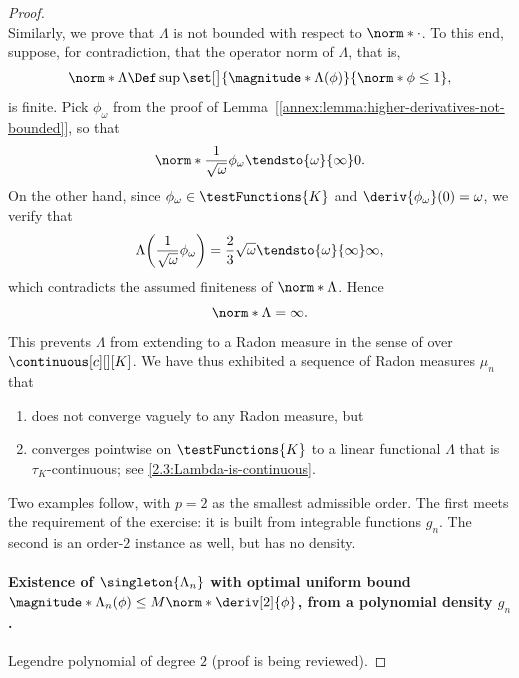 \begin{proof}
\begin{equation}
\end{equation}
% 
Similarly, we prove that $\Lambda$ is not bounded with respect to $\norm*{\cdot}$. To this end, suppose, for contradiction, %
that the operator norm of $\Lambda$, that is,
% 
\begin{equation}
  \norm*{\Lambda} \Def \sup\set[\big]{\magnitude*{\Lambda(\phi)}}{ \norm*{\phi} \leq 1}, 
\end{equation}
%
is finite. Pick $\phi_\omega$ from the proof of Lemma~[\ref{annex:lemma:higher-derivatives-not-bounded}], so that 
%
\begin{equation}
  \norm*{\frac{1}{\sqrt{\omega}}\phi_\omega} \tendsto{\omega}{\infty} 0.
\end{equation}
%
On the other hand, since $\phi_\omega \in \testFunctions{K}$ and $\deriv{\phi_\omega}(0) = \omega$, we verify that 
% 
\begin{equation}
  \Lambda\biggl(\frac{1}{\sqrt{\omega}}\phi_\omega \biggr) = \frac{2}{3} \sqrt{\omega} \tendsto{\omega}{\infty} \infty, 
\end{equation}
% 
which contradicts the assumed finiteness of $\norm*{\Lambda}$. Hence 
% 
\begin{equation}\label{2.3:Lambda-is-not-norm-bounded}
  \norm*{\Lambda} = \infty.
\end{equation}
% 
This prevents $\Lambda$ from extending to a Radon measure in the sense of \cite{AnalyseIII} over $\continuous[c][][K]$. %
We have thus exhibited a sequence of Radon measures $\mu_n$ that 
% 
\begin{enumerate}[item-label=(\alph{enumi})]
  \item{does not converge vaguely to any Radon measure, but}
  \item{
    converges pointwise on $\testFunctions{K}$ to a linear functional $\Lambda$ that is $\tau_K$-continuous; %
    see \eqref{2.3:Lambda-is-continuous}.
  }
\end{enumerate}
% 
Two examples follow, with $p=2$ as the smallest admissible order. The first meets the requirement of the exercise: it is %
built from integrable functions $g_n$. The second is an order-$2$ instance as well, but has no density.
% 
\paragraph{Existence of $\singleton{\Lambda_n}$ with optimal uniform bound %
  $\magnitude*{\Lambda_n(\phi)}\leq M\norm*{\deriv[2]{\phi}}$, from a polynomial density $g_n$.} %
%
Legendre polynomial of degree $2$ (proof is being reviewed). 
% 

\end{proof}
